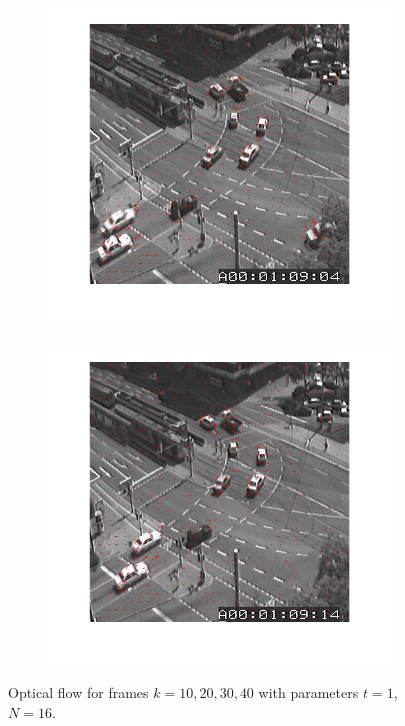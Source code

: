 \documentclass[a4paper]{iacas}
\begin{document}
\begin{figure}[!htbp]
	\begin{subfigure}[b]{0.4\textwidth}
		\includegraphics[width=\textwidth]{104.jpg}
		\caption{}
		\label{fig:104}
	\end{subfigure}
	\begin{subfigure}[b]{0.4\textwidth}
		\includegraphics[width=\textwidth]{105.jpg}
		\caption{}
		\label{fig:105}
	\end{subfigure}

	\label{fig:100}
	\caption{Optical flow for frames $k=10, 20, 30,40$ with parameters $t=1$, $N=16$.}
\end{figure}
\end{document}

